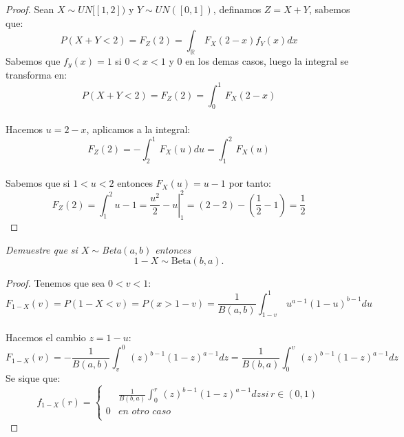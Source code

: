 \documentclass[11pt,letterpaper]{article}
\newcommand{\R}{\mathbb{R}}
\begin{document}
\begin{proof}
    Sean $X\sim UN[[1,2])$ y $Y\sim UN([0,1])$, definamos $Z=X+Y$, sabemos que:\,\\
    \begin{equation*}
        P(X+Y<2)=F_{Z}(2)=\int_{\R}\,F_{X}(2-x)f_{Y}(x)dx
    \end{equation*}
    Sabemos que $f_y(x)=1$ si $0<x<1$ y $0$ en los demas casos, luego la integral se transforma en:\,\\
    \begin{equation*}
        P(X+Y<2)=F_{Z}(2)=\int_{0}^{1}\,F_{X}(2-x)
    \end{equation*}\,\\
Hacemos $u=2-x$, aplicamos a la integral:\,\\
\begin{equation*}
    F_{Z}(2)=-\int_{2}^{1}\,F_{X}(u)du=\int_{1}^{2}\,F_{X}(u)
\end{equation*}\,\\
Sabemos que si $1<u<2$ entonces $F_{X}(u)=u-1$ por tanto:\,\\
\begin{equation*}
    F_{Z}(2)=\int_{1}^{2}u-1=\left.\frac{u^2}{2}-u\right|_{1}^{2}=(2-2)-\left(\frac{1}{2}-1\right)=\frac{1}{2}
\end{equation*}
\end{proof}
\newpage
\begin{tcolorbox}[
	title = \textcolor{black}{\textcolor{white}{Problema 8}},]
\textit{Demuestre que si $X\sim$Beta$(a,b)$ entonces $$1-X\sim\text{Beta}(b,a).$$}
\end{tcolorbox}
\begin{proof}
 Tenemos que sea $0<v<1$:\,\\
 \begin{equation*}
   F_{1-X}(v)=P(1-X<v)=P(x>1-v)=\frac{1}{B(a,b)}\int_{1-v}^{1}\,u^{a-1}(1-u)^{b-1}du
 \end{equation*}\,\\
 Hacemos el cambio $z=1-u$:\,\\
 \begin{equation*}
    F_{1-X}(v)=-\frac{1}{B(a,b)}\int_{v}^{0}\,(z)^{b-1}(1-z)^{a-1}dz=\frac{1}{B(b,a)}\int_{0}^{v}\,(z)^{b-1}(1-z)^{a-1}dz
 \end{equation*}
 Se sique que:
    \[
f_{1-X}(r) =
\begin{cases}
&\frac{1}{B(b,a)}\int_{0}^{r}\,(z)^{b-1}(1-z)^{a-1}dz si\,r\in (0,1 )\\
0 & en\,\,otro\,\,caso \\
\end{cases}\]
\end{proof}
\end{document}
